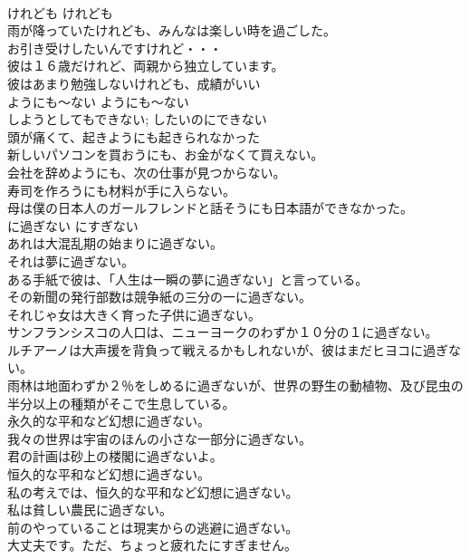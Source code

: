 \documentclass[8pt]{extreport}
\begin{document}
\begin{CJK}{UTF8}{min}
\\	けれども	けれども	
\\	雨が降っていたけれども、みんなは楽しい時を過ごした。 
\\	お引き受けしたいんですけれど・・・ 
\\	彼は１６歳だけれど、両親から独立しています。
\\	彼はあまり勉強しないけれども、成績がいい   
\\	ようにも〜ない	ようにも〜ない	
\\	しようとしてもできない; したいのにできない
\\	頭が痛くて、起きようにも起きられなかった  
\\	新しいパソコンを買おうにも、お金がなくて買えない。  
\\	会社を辞めようにも、次の仕事が見つからない。  
\\	寿司を作ろうにも材料が手に入らない。  
\\	母は僕の日本人のガールフレンドと話そうにも日本語ができなかった。   
\\	に過ぎない	にすぎない	
\\	あれは大混乱期の始まりに過ぎない。  
\\	それは夢に過ぎない。  
\\	ある手紙で彼は、「人生は一瞬の夢に過ぎない」と言っている。   
\\	その新聞の発行部数は競争紙の三分の一に過ぎない。  
\\	それじゃ女は大きく育った子供に過ぎない。   
\\	サンフランシスコの人口は、ニューヨークのわずか１０分の１に過ぎない。  
\\	ルチアーノは大声援を背負って戦えるかもしれないが、彼はまだヒヨコに過ぎない。   
\\	雨林は地面わずか２％をしめるに過ぎないが、世界の野生の動植物、及び昆虫の半分以上の種類がそこで生息している。  
\\	永久的な平和など幻想に過ぎない。  
\\	我々の世界は宇宙のほんの小さな一部分に過ぎない。  
\\	君の計画は砂上の楼閣に過ぎないよ。  
\\	恒久的な平和など幻想に過ぎない。   
\\	私の考えでは、恒久的な平和など幻想に過ぎない。   
\\	私は貧しい農民に過ぎない。  
\\	前のやっていることは現実からの逃避に過ぎない。   
\\	大丈夫です。ただ、ちょっと疲れたにすぎません。  

\end{CJK}
\end{document}
